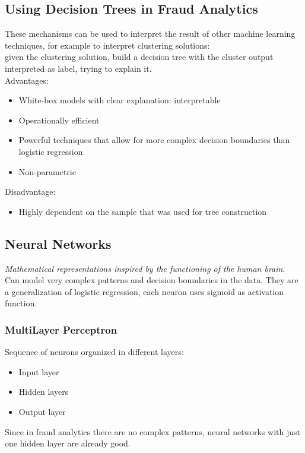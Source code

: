     \subsection{Using Decision Trees in Fraud Analytics}
        These mechanisms can be used to interpret the result of other machine learning techniques, for example to interpret clustering solutions:\\
        given the clustering solution, build a decision tree with the cluster output interpreted as label, trying to explain it.\\
        Advantages:
        \begin{itemize}
            \item White-box models with clear explanation: interpretable 
            \item Operationally efficient 
            \item Powerful techniques that allow for more complex decision boundaries than logistic regression 
            \item Non-parametric
        \end{itemize}
        Disadvantage:
        \begin{itemize}
            \item Highly dependent on the sample that was used for tree construction
        \end{itemize}
    \subsection{Neural Networks}
        \textit{Mathematical representations inspired by the functioning of the human brain}.\\
        Can model very complex patterns and decision boundaries in the data. They are a generalization of logistic regression, each neuron uses sigmoid as activation function.\\
        \subsubsection{MultiLayer Perceptron}
            Sequence of neurons organized in different layers:
            \begin{itemize}
                \item Input layer
                \item Hidden layers 
                \item Output layer 
            \end{itemize}
            Since in fraud analytics there are no complex patterns, neural networks with just one hidden layer are already good.
